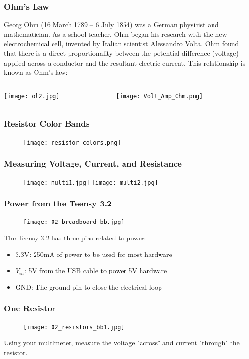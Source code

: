 \documentclass{beamer}
\begin{document}
\begin{frame}\frametitle{Ohm's Law}
Georg  Ohm (16 March 1789 – 6 July 1854) was a German physicist and mathematician. As a school teacher, Ohm began his research with the new electrochemical cell, invented by Italian scientist Alessandro Volta. Ohm found that there is a direct proportionality between the potential difference (voltage) applied across a conductor and the resultant electric current. This relationship is known as Ohm's law:
\vspace{0.5cm}
\begin{columns}
\begin{column}{5.5cm}
\texttt{[image: ol2.jpg]}
\end{column}
\begin{column}{5.5cm}
\texttt{[image: Volt\_Amp\_Ohm.png]}
\end{column}
\end{columns}
\end{frame}

\begin{frame}
\frametitle{Resistor Color Bands}
\begin{figure}
\texttt{[image: resistor\_colors.png]} 
\end{figure}
\end{frame}

\begin{frame}
\frametitle{Measuring Voltage, Current, and Resistance}
\begin{figure}
\texttt{[image: multi1.jpg]} 
\texttt{[image: multi2.jpg]} 
\end{figure}
\end{frame}

\begin{frame}
\frametitle{Power from the Teensy 3.2}
\begin{figure}
\texttt{[image: 02\_breadboard\_bb.jpg]} 
\end{figure}
The Teensy 3.2 has three pins related to power:
\begin{itemize}
\item 3.3V: 250mA of power to be used for most hardware
\item $V_{in}$:  5V from the USB cable to power 5V hardware
\item GND:  The ground pin to close the electrical loop
\end{itemize}
\end{frame}

\begin{frame}
\frametitle{One Resistor}
\begin{figure}
\texttt{[image: 02\_resistors\_bb1.jpg]} 
\end{figure}

\vspace{1.0cm}

Using your multimeter, measure the voltage "across" and current "through" the resistor.
\end{frame}
\end{document}
